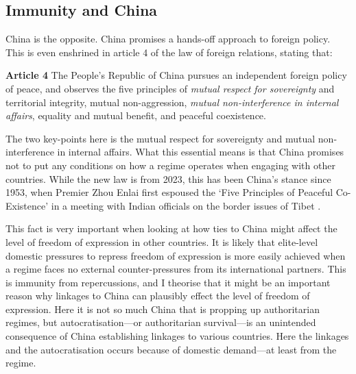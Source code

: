 \subsection{Immunity and China}

China is the opposite. China promises a hands-off approach to foreign policy. This is even enshrined in article 4 of the law of foreign relations, stating that:
\begin{displayquote}
\textbf{Article 4} The People's Republic of China pursues an independent foreign policy of peace, and observes the five principles of \textit{mutual respect for sovereignty} and territorial integrity, mutual non-aggression, \textit{mutual non-interference in internal affairs}, equality and mutual benefit, and peaceful coexistence. \citep[emphases are my own]{xinhua_law_2023}
\end{displayquote}
The two key-points here is the mutual respect for sovereignty and mutual non-interference in internal affairs. What this essential means is that China promises not to put any conditions on how a regime operates when engaging with other countries. While the new law is from 2023, this has been China's stance since 1953, when Premier Zhou Enlai first espoused the `Five Principles of Peaceful Co-Existence' in a meeting with Indian officials on the border issues of Tibet \citep{zhonghua_renmin_gongheguo_jiaowenbu_ministry_of_foreign_affairs_of_the_peoples_republic_of_china_zhongguo_2000}.

This fact is very important when looking at how ties to China might affect the level of freedom of expression in other countries. It is likely that elite-level domestic pressures to repress freedom of expression is more easily achieved when a regime faces no external counter-pressures from its international partners. This is immunity from repercussions, and I theorise that it might be an important reason why linkages to China can plausibly effect the level of freedom of expression. Here it is not so much China that is propping up authoritarian regimes, but autocratisation---or authoritarian survival---is an unintended consequence of China establishing linkages to various countries. Here the linkages and the autocratisation occurs because of domestic demand---at least from the regime.

